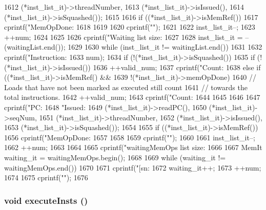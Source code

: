 \begin{DoxyCode}
{{1612                 (*inst_list_it)->threadNumber,
1613                 (*inst_list_it)->isIssued(),
1614                 (*inst_list_it)->isSquashed());
1615 
1616         if ((*inst_list_it)->isMemRef()) {
1617             cprintf("MemOpDone:%
1618         }
1619 
1620         cprintf("\n");
1621 
1622         inst_list_it--;
1623         ++num;
1624     }
1625 
1626     cprintf("Waiting list size: %
1627 
1628     inst_list_it = --(waitingList.end());
1629 
1630     while (inst_list_it != waitingList.end())
1631     {
1632         cprintf("Instruction:%
1633                 num);
1634         if (!(*inst_list_it)->isSquashed()) {
1635             if (!(*inst_list_it)->isIssued()) {
1636                 ++valid_num;
1637                 cprintf("Count:%
1638             } else if ((*inst_list_it)->isMemRef() &&
1639                        !(*inst_list_it)->memOpDone) {
1640                 // Loads that have not been marked as executed still count
1641                 // towards the total instructions.
1642                 ++valid_num;
1643                 cprintf("Count:%
1644             }
1645         }
1646 
1647         cprintf("PC:%
1648                 "Issued:%
1649                 (*inst_list_it)->readPC(),
1650                 (*inst_list_it)->seqNum,
1651                 (*inst_list_it)->threadNumber,
1652                 (*inst_list_it)->isIssued(),
1653                 (*inst_list_it)->isSquashed());
1654 
1655         if ((*inst_list_it)->isMemRef()) {
1656             cprintf("MemOpDone:%
1657         }
1658 
1659         cprintf("\n");
1660 
1661         inst_list_it--;
1662         ++num;
1663     }
1664 
1665     cprintf("waitingMemOps list size: %
1666 
1667     MemIt waiting_it = waitingMemOps.begin();
1668 
1669     while (waiting_it != waitingMemOps.end())
1670     {
1671         cprintf("[sn:%
1672         waiting_it++;
1673         ++num;
1674     }
1675     cprintf("\n");
1676 }
\end{DoxyCode}
\hypertarget{classLWBackEnd_a2d00e30d66a56e4667e28df302c98ac0}{
\subsubsection[{executeInsts}]{\setlength{\rightskip}{0pt plus 5cm}void executeInsts ()}}
\label{classLWBackEnd_a2d00e30d66a56e4667e28df302c98ac0}



